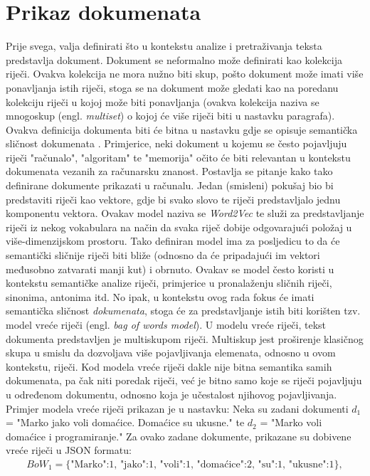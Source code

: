\documentclass[times, utf8, zavrsni, numeric]{fer}
\begin{document}
\section{Prikaz dokumenata}
\label{subchap:docmodel_docview}
Prije svega, valja definirati što u kontekstu analize i pretraživanja teksta predstavlja dokument. Dokument se neformalno može definirati kao kolekcija riječi. Ovakva kolekcija ne mora nužno biti skup, pošto dokument može imati više ponavljanja istih riječi, stoga se na dokument može gledati kao na poredanu kolekciju riječi u kojoj može biti ponavljanja  (ovakva kolekcija naziva se mnogoskup (engl. \textit{multiset}) o kojoj će više riječi biti u nastavku paragrafa). Ovakva definicija dokumenta biti će bitna u nastavku gdje se opisuje semantička sličnost dokumenata \cite{Hausler2013}. Primjerice, neki dokument u kojemu se često pojavljuju riječi "računalo", "algoritam" te "memorija" očito će biti relevantan u kontekstu dokumenata vezanih za računarsku znanost. Postavlja se pitanje kako tako definirane dokumente prikazati u računalu. Jedan (smisleni) pokušaj bio bi predstaviti riječi kao vektore, gdje bi svako slovo te riječi predstavljalo jednu komponentu vektora. Ovakav model naziva se \textit{Word2Vec} te služi za predstavljanje riječi iz nekog vokabulara na način da svaka riječ dobije odgovarajući položaj u više-dimenzijskom prostoru. Tako definiran model ima za posljedicu to da će semantički sličnije riječi biti bliže (odnosno da će pripadajući im vektori međusobno zatvarati manji kut) i obrnuto. Ovakav se model često koristi u kontekstu semantičke analize riječi, primjerice u pronalaženju sličnih riječi, sinonima, antonima itd. No ipak, u kontekstu ovog rada fokus će imati semantička sličnost \textit{dokumenata}, stoga će za predstavljanje istih biti korišten tzv. model vreće riječi (engl. \textit{bag of words model}). U modelu vreće riječi, tekst dokumenta predstavljen je multiskupom riječi. Multiskup jest proširenje klasičnog skupa u smislu da dozvoljava više pojavljivanja elemenata, odnosno u ovom kontekstu, riječi. Kod modela vreće riječi dakle nije bitna semantika samih dokumenata, pa čak niti poredak riječi, već je bitno samo koje se riječi pojavljuju u određenom dokumentu, odnosno koja je učestalost njihovog pojavljivanja. Primjer modela vreće riječi prikazan je u nastavku:
Neka su zadani dokumenti $d_{1}$ = "Marko jako voli domaćice. Domaćice su ukusne." te $d_{2}$ = "Marko voli domaćice i programiranje." Za ovako zadane dokumente, prikazane su dobivene vreće riječi u JSON formatu:
\begin{align*}
{{BoW_{1}}=\{\text{{"Marko":1, "jako":1, "voli":1, "domaćice":2, "su":1, "ukusne":1}}}\},
\end{align*}
\end{document}
